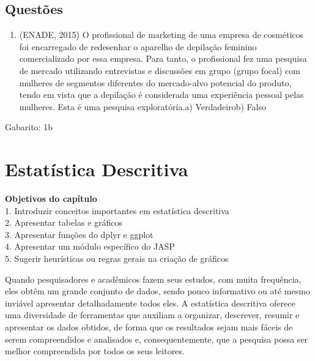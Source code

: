 \documentclass[
]{book}
\providecommand{\tightlist}{%
  \setlength{\itemsep}{0pt}\setlength{\parskip}{0pt}}
\newenvironment{objectives}{
  \definecolor{shadecolor}{rgb}{0, 0, 0}  %
  \color{white}
  \begin{shaded}}
 {\end{shaded}}
\newenvironment{question}{
  \definecolor{shadecolor}{rgb}{0, 0, 0}  %
  \color{white}
  \begin{shaded}}
 {\end{shaded}}
\begin{document}
\hypertarget{questuxf5es}{%
\section{Questões}\label{questuxf5es}}

\begin{question}

\begin{enumerate}
\def\labelenumi{\arabic{enumi}.}
\tightlist
\item
  (ENADE, 2015) O profissional de marketing de uma empresa de cosméticos foi encarregado de redesenhar o aparelho de depilação feminino comercializado por essa empresa. Para tanto, o profissional fez uma pesquisa de mercado utilizando entrevistas e discussões em grupo (grupo focal) com mulheres de segmentos diferentes do mercado-alvo potencial do produto, tendo em vista que a depilação é considerada uma experiência pessoal pelas mulheres. Esta é uma pesquisa exploratória.a) Verdadeirob) Falso
\end{enumerate}

\end{question}

Gabarito: 1b

\hypertarget{estatuxedstica-descritiva}{%
\chapter{Estatística Descritiva}\label{estatuxedstica-descritiva}}

\begin{objectives}
\textbf{Objetivos do capítulo}\\
1. Introduzir conceitos importantes em estatística descritiva\\
2. Apresentar tabelas e gráficos\\
3. Apresentar funções do dplyr e ggplot\\
4. Apresentar um módulo específico do JASP\\
5. Sugerir heurísticas ou regras gerais na criação de gráficos
\end{objectives}

Quando pesquisadores e acadêmicos fazem seus estudos, com muita frequência, eles obtêm um grande conjunto de dados, sendo pouco informativo ou até mesmo inviável apresentar detalhadamente todos eles. A estatística descritiva oferece uma diversidade de ferramentas que auxiliam a organizar, descrever, resumir e apresentar os dados obtidos, de forma que os resultados sejam mais fáceis de serem compreendidos e analisados e, consequentemente, que a pesquisa possa ser melhor compreendida por todos os seus leitores.
\end{document}
